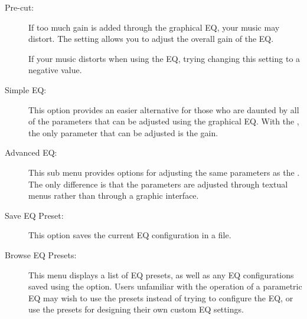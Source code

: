{\begin {description}
  \item[Pre-cut:]
  If too much gain is added through the graphical EQ, your music may distort.
  The  setting allows you to adjust the overall gain of the EQ.

  If your music distorts when using the EQ, trying changing this setting to a 
  negative value.

\item[Simple EQ:]
This option provides an easier alternative for those who are daunted by all of
the parameters that can be adjusted using the graphical EQ. With the
, the only parameter that can be adjusted is the gain.

\item[Advanced EQ:]
This sub menu provides options for adjusting the same parameters as the
. The only difference is that the parameters are
adjusted through textual menus rather than through a graphic interface.

\item[Save EQ Preset:]
This option saves the current EQ configuration in a  file.

\item[Browse EQ Presets:]
This menu displays a list of EQ presets, as well as any EQ configurations saved
using the  option. Users unfamiliar with the
operation of a parametric EQ may wish to use the presets instead of trying to
configure the EQ, or use the presets for designing their own custom EQ
settings.

\end{description}
}


